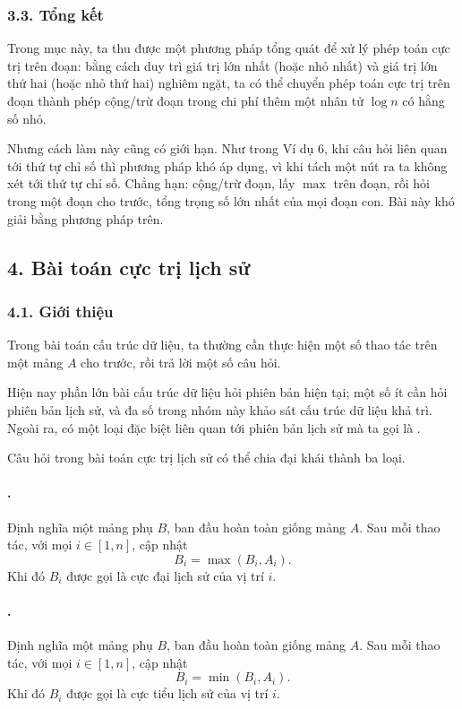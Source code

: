\documentclass[11pt]{article}
\begin{document}
\subsubsection*{3.3. Tổng kết}

Trong mục này, ta thu được một phương pháp tổng quát để xử lý phép toán cực
trị trên đoạn: bằng cách duy trì giá trị lớn nhất (hoặc nhỏ nhất) và giá trị
lớn thứ hai (hoặc nhỏ thứ hai) nghiêm ngặt, ta có thể chuyển phép toán cực
trị trên đoạn thành phép cộng/trừ đoạn trong chi phí thêm một nhân tử
\(\log n\) có hằng số nhỏ.

Nhưng cách làm này cũng có giới hạn. Như trong Ví dụ 6, khi câu hỏi liên quan
tới thứ tự chỉ số thì phương pháp khó áp dụng, vì khi tách một nút ra ta
không xét tới thứ tự chỉ số. Chẳng hạn: cộng/trừ đoạn, lấy \(\max\) trên
đoạn, rồi hỏi trong một đoạn cho trước, tổng trọng số lớn nhất của mọi đoạn
con. Bài này khó giải bằng phương pháp trên.

\subsection*{4. Bài toán cực trị lịch sử}

\subsubsection*{4.1. Giới thiệu}

Trong bài toán cấu trúc dữ liệu, ta thường cần thực hiện một số thao tác trên
một mảng \(A\) cho trước, rồi trả lời một số câu hỏi.

Hiện nay phần lớn bài cấu trúc dữ liệu hỏi phiên bản hiện tại; một số ít cần
hỏi phiên bản lịch sử, và đa số trong nhóm này khảo sát cấu trúc dữ liệu khả
trì. Ngoài ra, có một loại đặc biệt liên quan tới phiên bản lịch sử mà ta gọi
là .

Câu hỏi trong bài toán cực trị lịch sử có thể chia đại khái thành ba loại.

\paragraph{.}
Định nghĩa một mảng phụ \(B\), ban đầu hoàn toàn giống mảng \(A\). Sau mỗi
thao tác, với mọi \(i\in[1,n]\), cập nhật
\[
  B_i=\max(B_i,A_i).
\]
Khi đó \(B_i\) được gọi là cực đại lịch sử của vị trí \(i\).

\paragraph{.}
Định nghĩa một mảng phụ \(B\), ban đầu hoàn toàn giống mảng \(A\). Sau mỗi
thao tác, với mọi \(i\in[1,n]\), cập nhật
\[
  B_i=\min(B_i,A_i).
\]
Khi đó \(B_i\) được gọi là cực tiểu lịch sử của vị trí \(i\).
\end{document}
